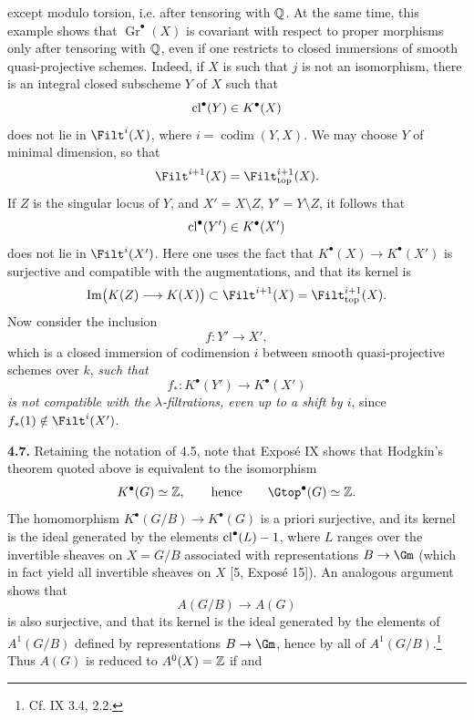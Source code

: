 except modulo torsion, i.e. after tensoring with $\mathbb Q$. At the same time,
this example shows that $\operatorname{Gr}^\bullet(X)$ is covariant with
respect to proper morphisms only after tensoring with $\mathbb Q$, even if one
restricts to closed immersions of smooth quasi-projective schemes. Indeed,
if $X$ is such that $j$ is not an isomorphism, there is an integral closed
subscheme $Y$ of $X$ such that
\[
 \operatorname{cl}^\bullet(Y)\in K^\bullet(X)
\]
does not lie in $\Filt^i(X)$, where $i=\operatorname{codim}(Y,X)$. We may
choose $Y$ of minimal dimension, so that
\[
 \Filt^{i+1}(X)=\Filt_{\mathrm{top}}^{i+1}(X).
\]
If $Z$ is the singular locus of $Y$, and $X'=X\setminus Z$,
$Y'=Y\setminus Z$, it follows that
\[
 \operatorname{cl}^\bullet(Y')\in K^\bullet(X')
\]
does not lie in $\Filt^i(X')$. Here one uses the fact that
$K^\bullet(X)\to K^\bullet(X')$ is surjective and compatible with the
augmentations, and that its kernel is
\[
 \operatorname{Im}\bigl(K(Z)\longrightarrow K(X)\bigr)
 \subset
 \Filt^{i+1}(X)=\Filt_{\mathrm{top}}^{i+1}(X).
\]
Now consider the inclusion
\[
 f:Y'\longrightarrow X',
\]
which is a closed immersion of codimension $i$ between smooth
quasi-projective schemes over $k$, \emph{such that}
\[
 f_*:K^\bullet(Y')\longrightarrow K^\bullet(X')
\]
\emph{is not compatible with the $\lambda$-filtrations, even up to a shift
by $i$}, since $f_*(1)\notin\Filt^i(X')$.

\noindent\textbf{4.7.}
Retaining the notation of 4.5, note that Exposé IX shows that Hodgkin's
theorem quoted above is equivalent to the isomorphism
\[
 K^\bullet(G)\simeq\Z,
 \qquad\text{hence}\qquad
 \Gtop^\bullet(G)\simeq\Z.
\]
The homomorphism $K^\bullet(G/B)\to K^\bullet(G)$ is a priori surjective,
and its kernel is the ideal generated by the elements
$\operatorname{cl}^\bullet(L)-1$, where $L$ ranges over the invertible sheaves on $X=G/B$
associated with representations $B\to\Gm$ (which in fact yield all
invertible sheaves on $X$ [5, Exposé 15]). An analogous argument shows that
\[
 A(G/B)\longrightarrow A(G)
\]
is also surjective, and that its kernel is the ideal generated by the
elements of $A^1(G/B)$ defined by representations $B\to\Gm$, hence by all
of $A^1(G/B)$.\footnote{Cf. IX 3.4, 2.2.} Thus $A(G)$ is reduced to
$A^0(X)=\mathbb Z$ if and
